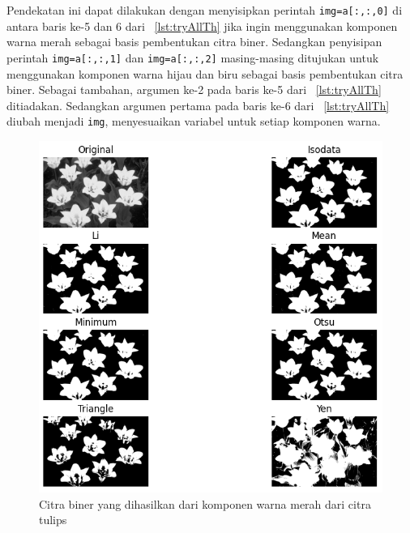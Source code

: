 Pendekatan ini dapat dilakukan dengan menyisipkan perintah \texttt{img=a[:,:,0]} di antara baris ke-5 dan 6 dari \lstlistingname~\ref{lst:tryAllTh} jika ingin menggunakan komponen warna merah sebagai basis pembentukan citra biner. Sedangkan penyisipan perintah \texttt{img=a[:,:,1]} dan \texttt{img=a[:,:,2]} masing-masing ditujukan untuk menggunakan komponen warna hijau dan biru sebagai basis pembentukan citra biner. Sebagai tambahan, argumen ke-2 pada baris ke-5 dari \lstlistingname~\ref{lst:tryAllTh} ditiadakan. Sedangkan argumen pertama pada baris ke-6 dari \lstlistingname~\ref{lst:tryAllTh} diubah menjadi \texttt{img}, menyesuaikan variabel untuk setiap komponen warna.

\begin{figure}
   \begin{center}
     \includegraphics[scale=.65]{pics/tryAllthTulipsRed.png}
     \caption{Citra biner yang dihasilkan dari komponen warna merah dari citra tulips}
     \label{fig:tryThRed}
   \end{center}
 \end{figure} 
 
